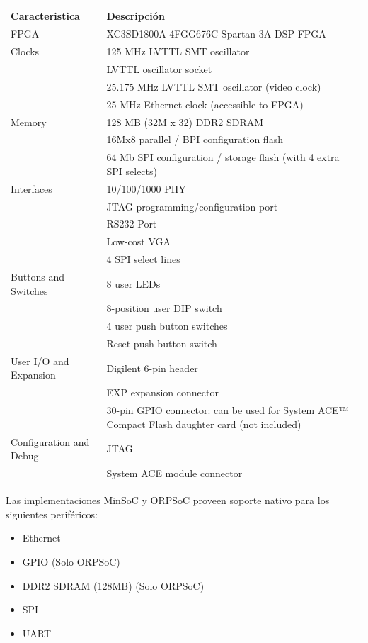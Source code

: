 				\begin{tabular}{ p{4cm} p{10cm} }
				\rowcolor[gray]{0.8} Caracteristica & Descripción \\		
				\hline FPGA   & XC3SD1800A-4FGG676C Spartan-3A DSP FPGA\\
				\hline Clocks & 125 MHz LVTTL SMT oscillator\\
				\hline        & LVTTL oscillator socket\\
				\hline		  & 25.175 MHz LVTTL SMT oscillator (video clock)\\
				\hline		  & 25 MHz Ethernet clock (accessible to FPGA)\\
				\hline Memory & 128 MB (32M x 32) DDR2 SDRAM\\
				\hline		  & 16Mx8 parallel / BPI configuration flash\\
				\hline 		  & 64 Mb SPI configuration / storage flash (with 4 extra SPI selects)\\
				\hline Interfaces & 10/100/1000 PHY\\
				\hline			  & JTAG programming/configuration port\\
				\hline            & RS232 Port\\
				\hline			  & Low-cost VGA\\
				\hline			  & 4 SPI select lines\\
				\hline Buttons and Switches & 8 user LEDs\\
				\hline  		  & 8-position user DIP switch\\
				\hline            & 4 user push button switches\\
				\hline 			  & Reset push button switch\\
				\hline User I/O and Expansion & Digilent 6-pin header\\
				\hline			 			  & EXP expansion connector\\
				\hline 						  & 30-pin GPIO connector: can be used for System ACE™ Compact Flash daughter card (not included)\\
				\hline Configuration and Debug & JTAG\\
				\hline                         & System ACE module connector\\   
				\end{tabular}
				
				Las implementaciones MinSoC y ORPSoC proveen soporte nativo para los siguientes periféricos:
				
				\begin{itemize}
				  \item Ethernet
				  \item GPIO (Solo ORPSoC)
				  \item DDR2 SDRAM (128MB) (Solo ORPSoC)
				  \item SPI
				  \item UART				
				\end{itemize}
			

